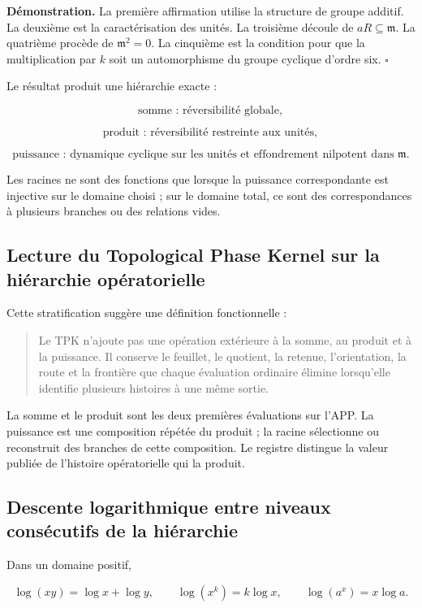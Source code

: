 \textbf{Démonstration.} La première affirmation utilise la structure de groupe additif. La deuxième est la caractérisation des unités. La troisième découle de \(aR\subseteq\mathfrak m\). La quatrième procède de \(\mathfrak m^2=0\). La cinquième est la condition pour que la multiplication par \(k\) soit un automorphisme du groupe cyclique d’ordre six. \(\square\)

Le résultat produit une hiérarchie exacte :

\[
\text{somme : réversibilité globale},
\]

\[
\text{produit : réversibilité restreinte aux unités},
\]

\[
\text{puissance : dynamique cyclique sur les unités et effondrement nilpotent dans }\mathfrak m.
\]

Les racines ne sont des fonctions que lorsque la puissance correspondante est injective sur le domaine choisi ; sur le domaine total, ce sont des correspondances à plusieurs branches ou des relations vides.

\subsection{Lecture du Topological Phase Kernel sur la hiérarchie opératorielle}

Cette stratification suggère une définition fonctionnelle :

\begin{quote}
Le TPK n’ajoute pas une opération extérieure à la somme, au produit et à la puissance. Il conserve le feuillet, le quotient, la retenue, l’orientation, la route et la frontière que chaque évaluation ordinaire élimine lorsqu’elle identifie plusieurs histoires à une même sortie.
\end{quote}

La somme et le produit sont les deux premières évaluations sur l’APP. La puissance est une composition répétée du produit ; la racine sélectionne ou reconstruit des branches de cette composition. Le registre distingue la valeur publiée de l’histoire opératorielle qui la produit.

\subsection{Descente logarithmique entre niveaux consécutifs de la hiérarchie}

Dans un domaine positif,

\[
\log(xy)=\log x+\log y,\qquad
\log(x^k)=k\log x,\qquad
\log(a^x)=x\log a.
\]

